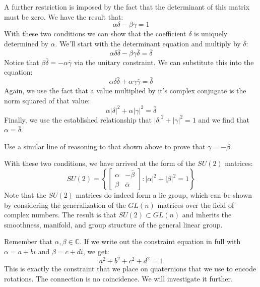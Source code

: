 A further restriction is imposed by the fact that the determinant of this matrix must be zero. We have the result that:
$$\alpha\delta-\beta\gamma=1$$
With these two conditions we can show that the coefficient $\delta$ is uniquely determined by $\alpha$. We'll start with the determinant equation and multiply by $\bar{\delta}$:
$$\alpha\delta\bar{\delta}-\beta\gamma\bar{\delta}=\bar{\delta}$$
Notice that $\beta\bar{\delta}=-\alpha\bar{\gamma}$  via the unitary constraint. We can substitute this into the equation:
$$\alpha\delta\bar{\delta}+\alpha\gamma\bar{\gamma}=\bar{\delta}$$
Again, we use the fact that a value multiplied by it's complex conjugate is the norm squared of that value:
$$\alpha|\delta|^2+\alpha|\gamma|^2=\bar{\delta}$$
Finally, we use the established relationship that $|\delta|^2+|\gamma|^2=1$ and we find that $\alpha=\bar{\delta}$.
\begin{exercise}
Use a similar line of reasoning to that shown above to prove that $\gamma=-\bar{\beta}$.
\end{exercise}

With these two conditions, we have arrived at the form of the $SU(2)$ matrices:
$$SU(2)=\left\{\begin{bmatrix}
    \alpha&-\bar{\beta}\\\beta&\bar{\alpha}
\end{bmatrix}:|\alpha|^2+|\beta|^2=1\right\}$$
Note that the $SU(2)$ matrices do indeed form a \gls{lie group}, which can be shown by considering the generalization of the $GL(n)$ matrices over the field of complex numbers. The result is that $SU(2)\subset GL(n)$ and inherits the smoothness, manifold, and group structure of the general linear group.

Remember that $\alpha,\beta\in\mathbb{C}$. If we write out the constraint equation in full with $\alpha=a+bi$ and $\beta=c+di$, we get:
$$a^2+b^2+c^2+d^2=1$$
This is exactly the constraint that we place on quaternions that we use to encode rotations. The connection is no coincidence. We will investigate it further.

